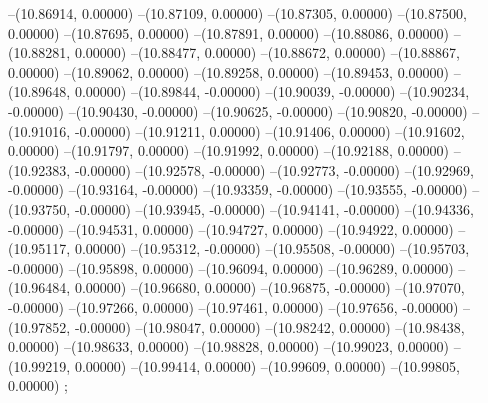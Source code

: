 --(10.86914, 0.00000)
--(10.87109, 0.00000)
--(10.87305, 0.00000)
--(10.87500, 0.00000)
--(10.87695, 0.00000)
--(10.87891, 0.00000)
--(10.88086, 0.00000)
--(10.88281, 0.00000)
--(10.88477, 0.00000)
--(10.88672, 0.00000)
--(10.88867, 0.00000)
--(10.89062, 0.00000)
--(10.89258, 0.00000)
--(10.89453, 0.00000)
--(10.89648, 0.00000)
--(10.89844, -0.00000)
--(10.90039, -0.00000)
--(10.90234, -0.00000)
--(10.90430, -0.00000)
--(10.90625, -0.00000)
--(10.90820, -0.00000)
--(10.91016, -0.00000)
--(10.91211, 0.00000)
--(10.91406, 0.00000)
--(10.91602, 0.00000)
--(10.91797, 0.00000)
--(10.91992, 0.00000)
--(10.92188, 0.00000)
--(10.92383, -0.00000)
--(10.92578, -0.00000)
--(10.92773, -0.00000)
--(10.92969, -0.00000)
--(10.93164, -0.00000)
--(10.93359, -0.00000)
--(10.93555, -0.00000)
--(10.93750, -0.00000)
--(10.93945, -0.00000)
--(10.94141, -0.00000)
--(10.94336, -0.00000)
--(10.94531, 0.00000)
--(10.94727, 0.00000)
--(10.94922, 0.00000)
--(10.95117, 0.00000)
--(10.95312, -0.00000)
--(10.95508, -0.00000)
--(10.95703, -0.00000)
--(10.95898, 0.00000)
--(10.96094, 0.00000)
--(10.96289, 0.00000)
--(10.96484, 0.00000)
--(10.96680, 0.00000)
--(10.96875, -0.00000)
--(10.97070, -0.00000)
--(10.97266, 0.00000)
--(10.97461, 0.00000)
--(10.97656, -0.00000)
--(10.97852, -0.00000)
--(10.98047, 0.00000)
--(10.98242, 0.00000)
--(10.98438, 0.00000)
--(10.98633, 0.00000)
--(10.98828, 0.00000)
--(10.99023, 0.00000)
--(10.99219, 0.00000)
--(10.99414, 0.00000)
--(10.99609, 0.00000)
--(10.99805, 0.00000)
;
